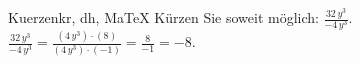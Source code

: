 \begin{MAufgabe}{Kuerzen}{kr, dh, MaTeX}
K\"urzen Sie soweit m\"oglich: $\frac{32\, y^3}{- 4\, y^3}$.\\ 
\ifLsg\MLoesung
\quad $\frac{32\, y^3}{- 4\, y^3}=\frac{(4\, y^3)\cdot(8)}{(4\, y^3)\cdot(-1)}=\frac{8}{-1}=-8$.\else\relax\fi
 \end{MAufgabe}